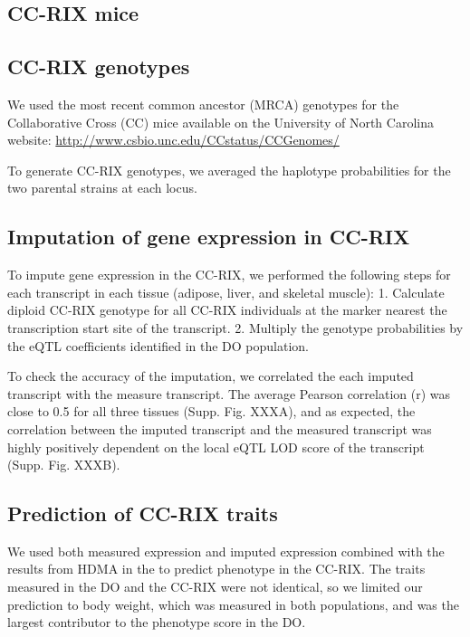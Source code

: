 \documentclass[
]{article}
\begin{document}
\subsection{CC-RIX mice}\label{cc-rix-mice}

\subsection{CC-RIX genotypes}\label{cc-rix-genotypes}

We used the most recent common ancestor (MRCA) genotypes for the
Collaborative Cross (CC) mice available on the University of North
Carolina website: \url{http://www.csbio.unc.edu/CCstatus/CCGenomes/}

To generate CC-RIX genotypes, we averaged the haplotype probabilities
for the two parental strains at each locus.

\subsection{Imputation of gene expression in
CC-RIX}\label{imputation-of-gene-expression-in-cc-rix}

To impute gene expression in the CC-RIX, we performed the following
steps for each transcript in each tissue (adipose, liver, and skeletal
muscle): 1. Calculate diploid CC-RIX genotype for all CC-RIX individuals
at the marker nearest the transcription start site of the transcript. 2.
Multiply the genotype probabilities by the eQTL coefficients identified
in the DO population.

To check the accuracy of the imputation, we correlated the each imputed
transcript with the measure transcript. The average Pearson correlation
(r) was close to 0.5 for all three tissues (Supp. Fig. XXXA), and as
expected, the correlation between the imputed transcript and the
measured transcript was highly positively dependent on the local eQTL
LOD score of the transcript (Supp. Fig. XXXB).

\subsection{Prediction of CC-RIX
traits}\label{prediction-of-cc-rix-traits}

We used both measured expression and imputed expression combined with
the results from HDMA in the to predict phenotype in the CC-RIX. The
traits measured in the DO and the CC-RIX were not identical, so we
limited our prediction to body weight, which was measured in both
populations, and was the largest contributor to the phenotype score in
the DO.
\end{document}
